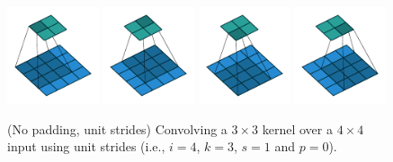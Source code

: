 \begin{figure}[p]
    \centering
    \includegraphics[width=0.24\textwidth]{pdf/no_padding_no_strides_00.pdf}
    \includegraphics[width=0.24\textwidth]{pdf/no_padding_no_strides_01.pdf}
    \includegraphics[width=0.24\textwidth]{pdf/no_padding_no_strides_02.pdf}
    \includegraphics[width=0.24\textwidth]{pdf/no_padding_no_strides_03.pdf}
    \caption{\label{fig:no_padding_no_strides} (No padding, unit strides)
        Convolving a $3 \times 3$ kernel over a $4 \times 4$ input using unit
        strides (i.e., $i = 4$, $k = 3$, $s = 1$ and $p = 0$).}
\end{figure}

